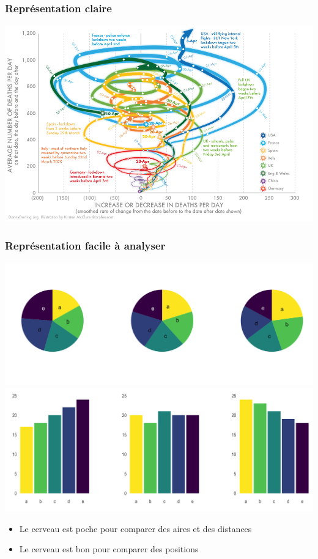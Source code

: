 \documentclass[aspectratio=169]{beamer}
\begin{document}
\begin{frame}[c]\frametitle{Représentation claire}
    
\begin{center}
\includegraphics[scale=.25]{figures/unclear-chart.png} 
\end{center}

\end{frame}




\begin{frame}[c]\frametitle{Représentation facile à analyser}
    
\vspace{-3mm}

\centering
\onslide<+->
\includegraphics[width=.6\textwidth, trim={2cm 6.2cm 1cm 5cm}, clip]{figures/pie-charts-bad.png}
\onslide<+->
\includegraphics[width=.6\textwidth]{figures/bar-charts-good.png}

\begin{itemize}
	\item<4-> Le cerveau est poche pour comparer des aires et des distances
	\item<4-> Le cerveau est bon pour comparer des positions
\end{itemize}

\end{frame}
\end{document}
